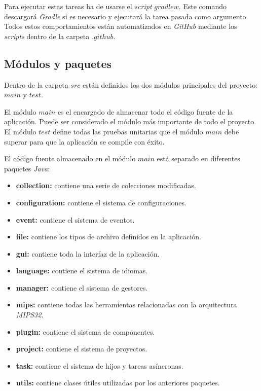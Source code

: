 Para ejecutar estas tareas ha de usarse el \textit{script} $gradlew$.
Este comando descargará \textit{Gradle} si es necesario y ejecutará
la tarea pasada como argumento.
Todos estos comportamientos están automatizados en \textit{GitHub}
mediante los \textit{scripts} dentro de la carpeta $.github$.

\subsection{Módulos y paquetes}\label{subsec:modulos-y-paquetes}

Dentro de la carpeta $src$ están definidos los dos módulos principales del
proyecto: $main$ y $test$.

El módulo $main$ es el encargado de almacenar todo el código fuente
de la aplicación.
Puede ser considerado el módulo más importante de todo el proyecto.
El módulo $test$ define todas las pruebas unitarias que el módulo $main$
debe superar para que la aplicación se compile con éxito.

El código fuente almacenado en el módulo $main$ está separado en diferentes
paquetes \textit{Java}:
\begin{itemize}
    \item \textbf{collection:} contiene una serie de colecciones modificadas.
    \item \textbf{configuration:} contiene el sistema de configuraciones.
    \item \textbf{event:} contiene el sistema de eventos.
    \item \textbf{file:} contiene los tipos de archivo definidos en la aplicación.
    \item \textbf{gui:} contiene toda la interfaz de la aplicación.
    \item \textbf{language:} contiene el sistema de idiomas.
    \item \textbf{manager:} contiene el sistema de gestores.
    \item \textbf{mips:} contiene todas las herramientas relacionadas con la arquitectura \textit{MIPS32}.
    \item \textbf{plugin:} contiene el sistema de componentes.
    \item \textbf{project:} contiene el sistema de proyectos.
    \item \textbf{task:} contiene el sistema de hijos y tareas asíncronas.
    \item \textbf{utils:} contiene clases útiles utilizadas por los anteriores paquetes.
\end{itemize}


